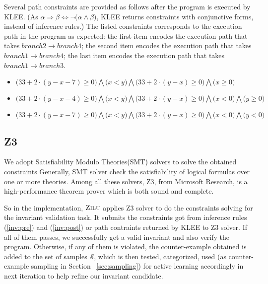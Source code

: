 Several path constraints are provided as follows after the program is executed by KLEE.
(As $\alpha \Rightarrow \beta \Longleftrightarrow \neg \big(\alpha \wedge \beta\big)$,
KLEE returns constraints with conjunctive forms, instead of inference rules.)
The listed constraints corresponds to the execution path in the program as expected:
the first item encodes the execution path that takes $branch2 \to branch4$;
the second item encodes the execution path that takes $branch1 \to branch4$;
the last item encodes the execution path that takes $branch1 \to branch3$.

\begin{itemize}
\item $\big(33+2\cdot(y-x-7)\ge0\big) \bigwedge \big(x<y\big) \bigwedge \big(33+2\cdot(y-x)\ge0\big) \bigwedge \big(x\ge0\big)$
\item $\big(33+2\cdot(y-x-4)\ge0\big) \bigwedge \big(x<y\big) \bigwedge \big(33+2\cdot(y-x)\ge0\big) \bigwedge \big(x<0\big) \bigwedge \big(y\ge0\big)$
\item $\big(33+2\cdot(y-x-7)\ge0\big) \bigwedge \big(x<y\big) \bigwedge \big(33+2\cdot(y-x)\ge0\big) \bigwedge \big(x<0\big) \bigwedge \big(y<0\big)$
\end{itemize}




\subsection{Z3}
\label{subsec:z3}

We adopt Satisfiability Modulo Theories(SMT) \cite{barrett2009satisfiability} solvers to solve the obtained constraints
Generally, SMT solver check the satisfiability of logical formulas over one or more theories.
Among all these solvers, Z3\cite{de2008z3}, from Microsoft Research, is a high-performance theorem prover which is both sound and complete.

So in the implementation, $\textsc{Zilu}$ applies Z3 solver to do the constraints solving for the invariant validation task.
It submits the constraints got from inference rules (\ref{inv:pre}) and (\ref{inv:post}) or path contraints returned by KLEE to Z3 solver.
If all of them passes, we successfully get a valid invariant and also verify the program.
Otherwise, if any of them is violated, the counter-example obtained is added to the set of samples $\mathcal{S}$,
which is then tested, categorized, used (as counter-example sampling in Section ~\ref{sec:sampling}) for active learning accordingly
in next iteration to help refine our invariant candidate.

